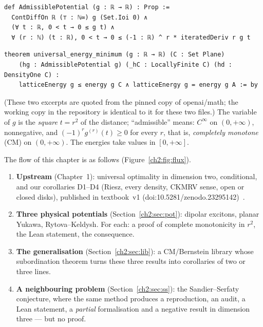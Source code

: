 \begin{leanbox}
\begin{lstlisting}[style=chdeux]
def AdmissiblePotential (g : ℝ → ℝ) : Prop :=
  ContDiffOn ℝ (⊤ : ℕ∞) g (Set.Ioi 0) ∧
  (∀ t : ℝ, 0 < t → 0 ≤ g t) ∧
  ∀ (r : ℕ) (t : ℝ), 0 < t → 0 ≤ (-1 : ℝ) ^ r * iteratedDeriv r g t
\end{lstlisting}
\end{leanbox}
\begin{leanbox}
\begin{lstlisting}[style=chdeux]
theorem universal_energy_minimum (g : ℝ → ℝ) (C : Set Plane)
    (hg : AdmissiblePotential g) (_hC : LocallyFinite C) (hd : DensityOne C) :
    latticeEnergy g ≤ energy g C ∧ latticeEnergy g = energy g A := by
\end{lstlisting}
\end{leanbox}
\noindent (These two excerpts are quoted from the pinned copy of openai/math; the working copy
 in the repository is identical to it for these two files.) The variable of $g$ is the \emph{square} $t=r^2$ of the
distance; ``admissible'' means: $C^\infty$ on $(0,+\infty)$, nonnegative, and $(-1)^r g^{(r)}(t)\ge0$ for every $r$,
that is, \emph{completely monotone} (CM) on $(0,+\infty)$. The energies take values in $[0,+\infty]$.

The flow of this chapter is as follows (Figure~\ref{ch2:fig:flux}).
\begin{enumerate}[itemsep=1pt]
\item \textbf{Upstream} (Chapter~1): universal optimality in dimension two, \tierA{} conditional, and our corollaries
D1--D4 (Riesz, every density, CKMRV sense, open or closed disks), published in textbook~v1
(doi\string:10.5281/zenodo.23295142)~\cite{v1}.
\item \textbf{Three physical potentials} (Section~\ref{ch2:sec:pot}): dipolar excitons, planar Yukawa, Rytova--Keldysh.
For each: a proof of complete monotonicity in $r^2$, the Lean statement, the consequence.
\item \textbf{The generalisation} (Section~\ref{ch2:sec:lib}): a CM/Bernstein library whose subordination theorem turns
these three results into corollaries of two or three lines.
\item \textbf{A neighbouring problem} (Section~\ref{ch2:sec:ss}): the Sandier--Serfaty conjecture, where the same method
produces a reproduction, an audit, a Lean statement, a \emph{partial} formalisation and a negative result in dimension
three --- but no proof.
\end{enumerate}

